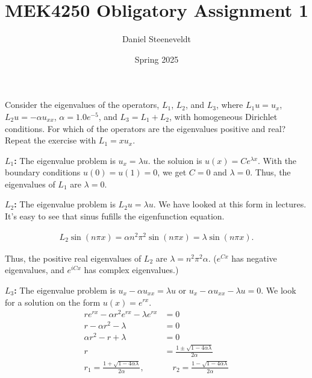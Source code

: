 \documentclass[a4paper,12pt]{article}
\title{
    MEK4250 Obligatory Assignment 1
}
\author{Daniel Steeneveldt}
\date{Spring 2025}
\theoremstyle{exerciseStyle}
\theoremstyle{solutionStyle}
\begin{document}
\maketitle




\begin{exercise}{5.6}
    Consider the eigenvalues of the operators, $L_1$, $L_2$, and $L_3$, where $L_1 u = u_x$, $L_2 u = -\alpha u_{xx}$, $\alpha = 1.0 e^{-5}$, and $L_3 = L_1 + L_2$, with homogeneous Dirichlet conditions.
    For which of the operators are the eigenvalues positive and real?
    Repeat the exercise with $L_1 = x u_x$.
\end{exercise}

\begin{solution}{5.6}

    \medskip\noindent\textbf{$L_1$:}
    The eigenvalue problem is $u_x = \lambda u$.
    the soluion is $u(x) = C e^{\lambda x}$.
    With the boundary conditions $u(0) = u(1) = 0$, we get $C = 0$ and $\lambda = 0$.
    Thus, the eigenvalues of $L_1$ are $\lambda = 0$.


    \medskip\noindent\textbf{$L_2$:}
    The eigenvalue problem is $L_2 u = \lambda u$. We have looked at this form in lectures.
    It's easy to see that sinus fufills the eigenfunction equation.

    \begin{align*}
        L_2 \sin(n \pi x) = \alpha n^2 \pi^2  \sin(n \pi x) = \lambda \sin(n \pi x).
    \end{align*}%

    Thus, the positive real eigenvalues of $L_2$ are $\lambda = n^2 \pi^2 \alpha$. ($e^{C x}$ has
    negative eigenvalues, and $e^{i C x}$ has complex eigenvalues.)

    \medskip\noindent\textbf{$L_3$:}
    The eigenvalue problem is
    $u_x - \alpha u_{xx} = \lambda u$ or $u_x - \alpha u_{xx} - \lambda u = 0$.
    We look for a solution on the form $u(x) = e^{r x}$.
    \begin{align*}
        r e^{r x} - \alpha r^2 e^{r x} - \lambda e^{r x}        & = 0                                                  \\
        r - \alpha r^2 - \lambda                                & = 0                                                  \\
        \alpha r^2 - r + \lambda                                & = 0                                                  \\
        r                                                       & = \frac{1 \pm \sqrt{1 - 4 \alpha \lambda}}{2 \alpha} \\
        r_1 = \frac{1 + \sqrt{1 - 4 \alpha \lambda}}{2 \alpha}, &
        \quad r_2 = \frac{1 - \sqrt{1 - 4 \alpha \lambda}}{2 \alpha}                                                   \\
    \end{align*}%


\end{solution}
\end{document}
